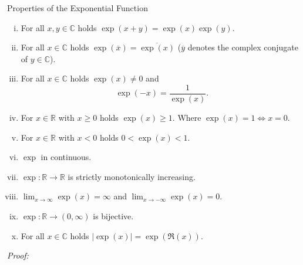 \begin{Theorem}{Properties of the Exponential Function}\label{thm:expprop}
 \begin{enumerate}[(i)]
  \item For all $x,y\in\mathbb{C}$ holds $\exp(x+y)=\exp(x)\exp(y)$.
  \item For all $x\in\mathbb{C}$ holds $\exp(\overline{x})=\overline{\exp(x)}$ ($\overline{y}$ denotes the complex conjugate of $y\in\mathbb{C}$).
  \item For all $x\in\mathbb{C}$ holds $\exp(x)\neq0$ and
\[\exp(-x)=\frac1{\exp(x)}.\]
  \item For $x\in\mathbb{R}$ with $x\geq0$ holds $\exp(x)\geq1$. Where $\exp(x)=1 \Leftrightarrow x=0$.
  \item For $x\in\mathbb{R}$ with $x<0$ holds $0<\exp(x)<1$.
  \item $\exp$ in continuous.
  \item $\exp:\mathbb{R}\to\mathbb{R}$ is strictly monotonically increasing.
  \item $\lim_{x\to\infty}\exp(x)=\infty$ and $\lim_{x\to-\infty}\exp(x)=0$.
  \item $\exp:\mathbb{R}\to(0,\infty)$ is bijective.
  \item For all $x\in\mathbb{C}$ holds $|\exp(x)|=\exp(\Re(x))$.
 \end{enumerate}
\end{Theorem}
{\em Proof:}
